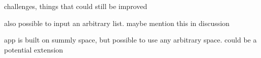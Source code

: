 \documentclass[12pt]{article}
\begin{document}
challenges, things that could still be improved

also possible to input an arbitrary list. maybe mention this in discussion

app is built on summly space, but possible to use any arbitrary space. could be a potential extension 





\end{document}
